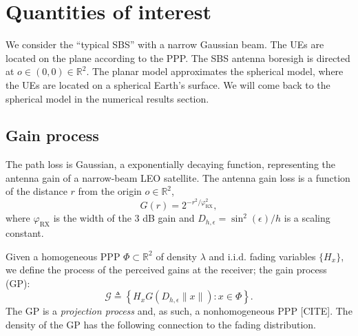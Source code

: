 \documentclass[lettersize,journal]{IEEEtran}
\newcommand{\R}{\mathbb{R}}
\begin{document}
\section{Quantities of interest}
We consider the ``typical SBS'' with a narrow Gaussian beam. The UEs are located on the plane according to the PPP. The SBS antenna boresigh is directed at $\textit{o} \in (0,0) \in \R^2$. The planar model approximates the spherical model, where the UEs are located on a spherical Earth's surface. We will come back to the spherical model in the numerical results section.



\subsection{Gain process}
The path loss is Gaussian, a exponentially decaying function, representing the antenna gain of a narrow-beam LEO satellite. The antenna gain loss is a function of the distance $r$ from the origin $\textit{o}\in \R^2$, 
\begin{equation}
  G(r) = 2^{-r^2/\varphi^2_{\text{RX}}},
\end{equation}
where $\varphi_{\text{RX}}$ is the width of the $3$ dB gain and $D_{h,\epsilon}=\sin^2(\epsilon)/h$ is a scaling constant. 

Given a homogeneous PPP $\Phi \subset \R^2$ of density $\lambda$ and i.i.d. fading variables $\{H_x\}$, we define the process of the perceived gains at the receiver; the gain process (GP):
\begin{equation}
  \label{eq:gainprocess}
  \mathcal{G} \triangleq \left\{ H_x G(D_{h,\epsilon}\|x\|):x \in \Phi  \right\}.
\end{equation}
The GP is a \textit{projection process} and, as such, a nonhomogeneous PPP [CITE]. The density of the GP has the following connection to the fading distribution.
\end{document}
